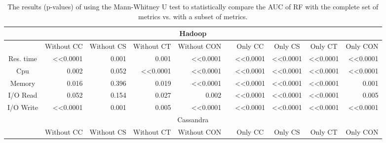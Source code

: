 \begin{table}
\tabcolsep=0.05cm
\tiny
\caption{The results (p-values) of using the Mann-Whitney U test to statistically compare the AUC of RF with the complete set of metrics vs. with a subset of metrics.}
    \begin{tabular}{|c|r|r|r|r|r|r|r|r|r|}
    \hline
    \multicolumn{10}{|c|}{Hadoop}   \\ \hline
              & \multicolumn{1}{c|}{Without   CC} & \multicolumn{1}{c|}{Without   CS} & \multicolumn{1}{c|}{Without CT} & \multicolumn{1}{c|}{Without   CON} & \multicolumn{1}{c|}{} & \multicolumn{1}{c|}{Only CC}   & \multicolumn{1}{c|}{Only  CS} & \multicolumn{1}{c|}{Only  CT} & \multicolumn{1}{c|}{Only  CON} \\ \cline{1-5} \cline{7-10} 
    Res. time & \textless{}\textless{}0.0001      & 0.001    & 0.001  & \textless{}\textless{}0.0001       &                       & \textless{}\textless{}0.0001   & \textless{}\textless{}0.0001  & \textless{}\textless{}0.0001  & \textless{}\textless{}0.0001   \\ \cline{1-5} \cline{7-10} 
    Cpu       & 0.002    & 0.052    & \textless{}\textless{}0.0001    & \textless{}\textless{}0.0001       &                       & \textless{}\textless{}0.0001   & \textless{}\textless{}0.0001  & \textless{}\textless{}0.0001  & \textless{}\textless{}0.0001   \\ \cline{1-5} \cline{7-10} 
    Memory    & 0.016    & 0.396    & 0.019  & \textless{}\textless{}0.0001       &                       & \textless{}\textless{}0.0001   & \textless{}\textless{}0.0001  & \textless{}\textless{}0.0001  & 0.001 \\ \cline{1-5} \cline{7-10} 
    I/O Read  & 0.052    & 0.154    & 0.027  & 0.002     &                       & \textless{}\textless{}0.0001   & \textless{}\textless{}0.0001  & \textless{}\textless{}0.0001  & 0.005 \\ \cline{1-5} \cline{7-10} 
    I/O Write & \textless{}\textless{}0.0001      & 0.001    & 0.005  & \textless{}\textless{}0.0001       &                       & \textless{}\textless{}0.0001   & \textless{}\textless{}0.0001  & \textless{}\textless{}0.0001  & \textless{}\textless{}0.0001   \\ \hline
    \multicolumn{10}{|c|}{Cassandra}\\ \hline
              & \multicolumn{1}{c|}{Without   CC} & \multicolumn{1}{c|}{Without   CS} & \multicolumn{1}{c|}{Without CT} & \multicolumn{1}{c|}{Without   CON} & \multicolumn{1}{c|}{} & \multicolumn{1}{c|}{Only   CC} & \multicolumn{1}{c|}{Only  CS} & \multicolumn{1}{c|}{Only  CT} & \multicolumn{1}{c|}{Only  CON} \\ \cline{1-5} \cline{7-10} 

\end{tabular}
\end{table}
